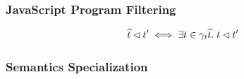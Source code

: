 \subsubsection{JavaScript Program Filtering}

\[
  \widehat{t} \lhd t' \iff \exists t \in \gamma_t{\widehat{t}}. \; t
  \lhd t'
\]

\todo

\subsubsection{Semantics Specialization}

\todo

